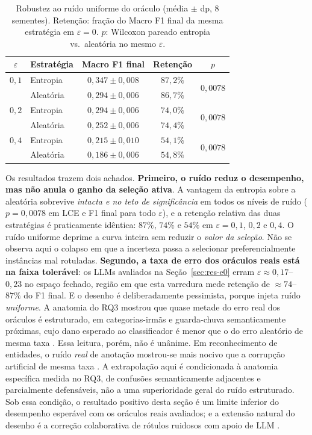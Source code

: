 \begin{table}[htb]
\centering
\caption{Robustez ao ruído uniforme do oráculo (média $\pm$ dp, 8
sementes). Retenção: fração do Macro F1 final da mesma estratégia em
$\varepsilon=0$. $p$: Wilcoxon pareado entropia vs.\ aleatória no mesmo
$\varepsilon$.}
\label{tab:e4}
\begin{tabular}{clccc}
\toprule
$\varepsilon$ & Estratégia & Macro F1 final & Retenção & $p$ \\
\midrule
$0{,}1$ & Entropia  & $0{,}347 \pm 0{,}008$ & $87{,}2\%$ & \multirow{2}{*}{$0{,}0078$} \\
        & Aleatória & $0{,}294 \pm 0{,}006$ & $86{,}7\%$ & \\
\midrule
$0{,}2$ & Entropia  & $0{,}294 \pm 0{,}006$ & $74{,}0\%$ & \multirow{2}{*}{$0{,}0078$} \\
        & Aleatória & $0{,}252 \pm 0{,}006$ & $74{,}4\%$ & \\
\midrule
$0{,}4$ & Entropia  & $0{,}215 \pm 0{,}010$ & $54{,}1\%$ & \multirow{2}{*}{$0{,}0078$} \\
        & Aleatória & $0{,}186 \pm 0{,}006$ & $54{,}8\%$ & \\
\bottomrule
\end{tabular}
\end{table}

Os resultados trazem dois achados. \textbf{Primeiro, o ruído reduz o desempenho, mas não anula o ganho da seleção ativa}. A
vantagem da entropia sobre a aleatória sobrevive \emph{intacta e no teto de
significância} em todos os níveis de ruído ($p=0{,}0078$ em LCE e F1 final para
todo $\varepsilon$), e a retenção relativa das duas estratégias é praticamente
idêntica: $87\%$, $74\%$ e $54\%$ em $\varepsilon=0{,}1$, $0{,}2$ e $0{,}4$. O
ruído uniforme deprime a curva inteira sem reduzir o \emph{valor da seleção}. Não
se observa aqui o colapso em que a incerteza passa a selecionar
preferencialmente instâncias mal rotuladas. \textbf{Segundo, a taxa de erro dos oráculos
reais está na faixa tolerável}: os LLMs avaliados na Seção~\ref{sec:res-e0} erram
$\varepsilon \approx 0{,}17$--$0{,}23$ no espaço fechado, região em que esta
varredura mede retenção de $\approx 74$--$87\%$ do F1 final. E o desenho é deliberadamente pessimista, porque injeta ruído \emph{uniforme}.
A anatomia do RQ3 mostrou que quase metade do erro real dos oráculos é
estruturado, em categorias-irmãs e guarda-chuva semanticamente próximas, cujo
dano esperado ao classificador é menor que o do erro aleatório de mesma taxa
\citep{Frenay2014,Song2023NoisyLabels}. Essa leitura, porém, não é unânime. Em reconhecimento de
entidades, o ruído \emph{real} de anotação mostrou-se mais nocivo que a
corrupção artificial de mesma taxa \citep{Merdjanovska2024NoiseBench}. A
extrapolação aqui é condicionada à anatomia específica medida no RQ3, de
confusões semanticamente adjacentes e parcialmente defensáveis, não a uma
superioridade geral do ruído estruturado. Sob essa condição, o resultado positivo desta seção é um limite
inferior do desempenho esperável com os oráculos reais avaliados; e a extensão
natural do desenho é a correção colaborativa de rótulos ruidosos com apoio
de LLM \citep{Yuan2025NoiseAL}.

